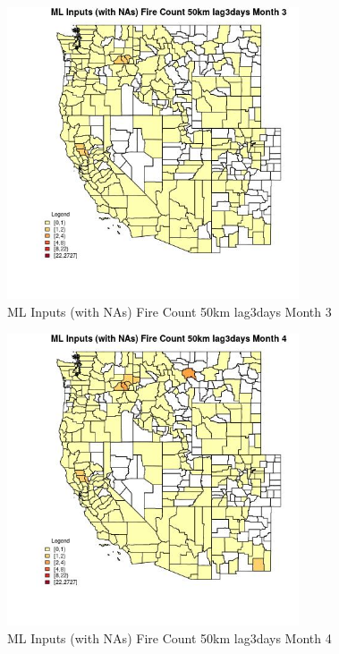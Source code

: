 \begin{figure} 
\centering  
\includegraphics[width=0.77\textwidth]{Code_Outputs/Report_ML_input_PM25_Step4_part_f_de_duplicated_aves_prioritize_24hr_obswNAs_CountyFire_Count_50km_lag3daysmedianMonth3.jpg} 
\caption{\label{fig:Report_ML_input_PM25_Step4_part_f_de_duplicated_aves_prioritize_24hr_obswNAsCountyFire_Count_50km_lag3daysmedianMonth3}ML Inputs (with NAs) Fire Count 50km lag3days Month 3} 
\end{figure} 
 

\begin{figure} 
\centering  
\includegraphics[width=0.77\textwidth]{Code_Outputs/Report_ML_input_PM25_Step4_part_f_de_duplicated_aves_prioritize_24hr_obswNAs_CountyFire_Count_50km_lag3daysmedianMonth4.jpg} 
\caption{\label{fig:Report_ML_input_PM25_Step4_part_f_de_duplicated_aves_prioritize_24hr_obswNAsCountyFire_Count_50km_lag3daysmedianMonth4}ML Inputs (with NAs) Fire Count 50km lag3days Month 4} 
\end{figure} 
 

